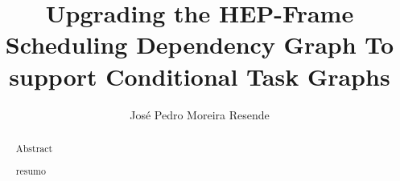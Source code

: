 \documentclass[a4paper, twoside]{report}
\title{Upgrading the HEP-Frame Scheduling Dependency Graph To support Conditional Task Graphs }
\author{José Pedro Moreira Resende}
\begin{document}


\begin{abstract}
  Abstract
\end{abstract}

\renewcommand{\abstractname}{Resumo}
\begin{abstract}
  resumo
\end{abstract}


\clearpage %

\tableofcontents
\listoffigures
\listoftables


\end{document}
